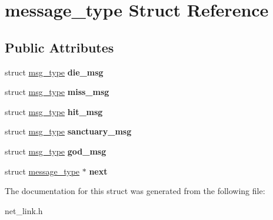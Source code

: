 \hypertarget{structmessage__type}{\section{message\-\_\-type Struct Reference}
\label{structmessage__type}
}
\subsection*{Public Attributes}
\begin{DoxyCompactItemize}
\item 
\hypertarget{structmessage__type_a80133b1d5675854fbf911df074e17290}{struct \hyperlink{structmsg__type}{msg\-\_\-type} {\bfseries die\-\_\-msg}}\label{structmessage__type_a80133b1d5675854fbf911df074e17290}

\item 
\hypertarget{structmessage__type_ad17635689f46c02c4e09f3c38a06a796}{struct \hyperlink{structmsg__type}{msg\-\_\-type} {\bfseries miss\-\_\-msg}}\label{structmessage__type_ad17635689f46c02c4e09f3c38a06a796}

\item 
\hypertarget{structmessage__type_ad9bb87d7fe2057fd8fffb7cbcdd7f59c}{struct \hyperlink{structmsg__type}{msg\-\_\-type} {\bfseries hit\-\_\-msg}}\label{structmessage__type_ad9bb87d7fe2057fd8fffb7cbcdd7f59c}

\item 
\hypertarget{structmessage__type_a520d0384870088e1313600b674b03e85}{struct \hyperlink{structmsg__type}{msg\-\_\-type} {\bfseries sanctuary\-\_\-msg}}\label{structmessage__type_a520d0384870088e1313600b674b03e85}

\item 
\hypertarget{structmessage__type_ac5ad50968cab26b2471918bef0af98e8}{struct \hyperlink{structmsg__type}{msg\-\_\-type} {\bfseries god\-\_\-msg}}\label{structmessage__type_ac5ad50968cab26b2471918bef0af98e8}

\item 
\hypertarget{structmessage__type_ab057ca90031d1883592f0437e9ef0db6}{struct \hyperlink{structmessage__type}{message\-\_\-type} $\ast$ {\bfseries next}}\label{structmessage__type_ab057ca90031d1883592f0437e9ef0db6}

\end{DoxyCompactItemize}


The documentation for this struct was generated from the following file\-:\begin{DoxyCompactItemize}
\item 
net\-\_\-link.\-h\end{DoxyCompactItemize}
